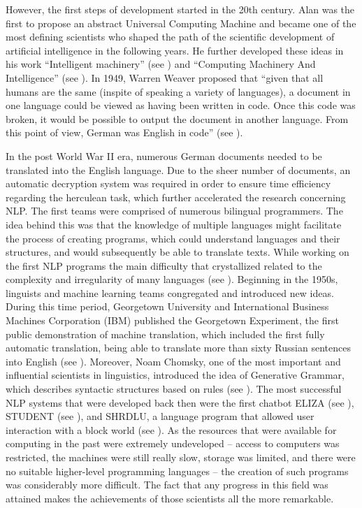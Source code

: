 \documentclass[]{krantz}
\begin{document}
However, the first steps of development started in the 20th century. Alan \citet{turing1937} was the first to propose an abstract Universal Computing Machine and became one of the most defining scientists who shaped the path of the scientific development of artificial intelligence in the following years. He further developed these ideas in his work ``Intelligent machinery'' (see \citet{turing1948}) and ``Computing Machinery And Intelligence'' (see \citet{turing1950}).
In 1949, Warren Weaver proposed that ``given that all humans are the same (inspite of speaking a variety of languages), a document in one language could be viewed as having been written in code. Once this code was broken, it would be possible to output the document in another language. From this point of view, German was English in code'' (see \citet{weaver1949}).

In the post World War II era, numerous German documents needed to be translated into the English language. Due to the sheer number of documents, an automatic decryption system was required in order to ensure time efficiency regarding the herculean task, which further accelerated the research concerning NLP. The first teams were comprised of numerous bilingual programmers. The idea behind this was that the knowledge of multiple languages might facilitate the process of creating programs, which could understand languages and their structures, and would subsequently be able to translate texts. While working on the first NLP programs the main difficulty that crystallized related to the complexity and irregularity of many languages (see \citet{hancox1996}).
Beginning in the 1950s, linguists and machine learning teams congregated and introduced new ideas. During this time period, Georgetown University and International Business Machines Corporation (IBM) published the Georgetown Experiment, the first public demonstration of machine translation, which included the first fully automatic translation, being able to translate more than sixty Russian sentences into English (see \citet{hutchins2005}).
Moreover, Noam Chomsky, one of the most important and influential scientists in linguistics, introduced the idea of Generative Grammar, which describes syntactic structures based on rules (see \citet{chomsky1957}). The most successful NLP systems that were developed back then were the first chatbot ELIZA (see \citet{weizenbaum1966}), STUDENT (see \citet{bobrow1964}), and SHRDLU, a language program that allowed user interaction with a block world (see \citet{winograd1972}). As the resources that were available for computing in the past were extremely undeveloped -- access to computers was restricted, the machines were still really slow, storage was limited, and there were no suitable higher-level programming languages -- the creation of such programs was considerably more difficult. The fact that any progress in this field was attained makes the achievements of those scientists all the more remarkable.
\end{document}

